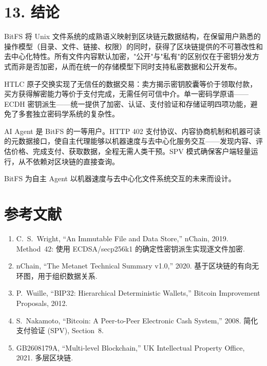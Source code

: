 \documentclass[11pt,a4paper]{article}
\begin{document}
\section{13. 结论}

BitFS 将 Unix 文件系统的成熟语义映射到区块链元数据结构，在保留用户熟悉的操作模型（目录、文件、链接、权限）的同时，获得了区块链提供的不可篡改性和去中心化特性。所有文件内容默认加密，"公开"与"私有"的区别仅在于密钥分发方式而非是否加密，从而在统一的存储模型下同时支持私密数据和公开发布。

HTLC 原子交换实现了无信任的数据交易：卖方揭示密钥胶囊等价于领取付款，买方获得解密能力等价于支付完成，无需任何可信中介。单一密码学原语——ECDH 密钥派生——统一提供了加密、认证、支付验证和存储证明四项功能，避免了多套独立密码学系统的复杂性。

AI Agent 是 BitFS 的一等用户。HTTP 402 支付协议、内容协商机制和机器可读的元数据接口，使自主代理能够以机器速度与去中心化服务交互——发现内容、评估价格、完成支付、获取数据，全程无需人类干预。SPV 模式确保客户端轻量运行，从不依赖对区块链的直接查询。

BitFS 为自主 Agent 以机器速度与去中心化文件系统交互的未来而设计。

\section*{参考文献}

\begin{enumerate}
\item C.~S.~Wright, ``An Immutable File and Data Store,'' nChain, 2019. Method~42: 使用 ECDSA/secp256k1 的确定性密钥派生实现逐文件加密.

\item nChain, ``The Metanet Technical Summary v1.0,'' 2020. 基于区块链的有向无环图，用于组织数据关系.

\item P.~Wuille, ``BIP32: Hierarchical Deterministic Wallets,'' Bitcoin Improvement Proposals, 2012.

\item S.~Nakamoto, ``Bitcoin: A Peer-to-Peer Electronic Cash System,'' 2008. 简化支付验证 (SPV), Section~8.

\item GB2608179A, ``Multi-level Blockchain,'' UK Intellectual Property Office, 2021. 多层区块链.
\end{enumerate}
\end{document}
